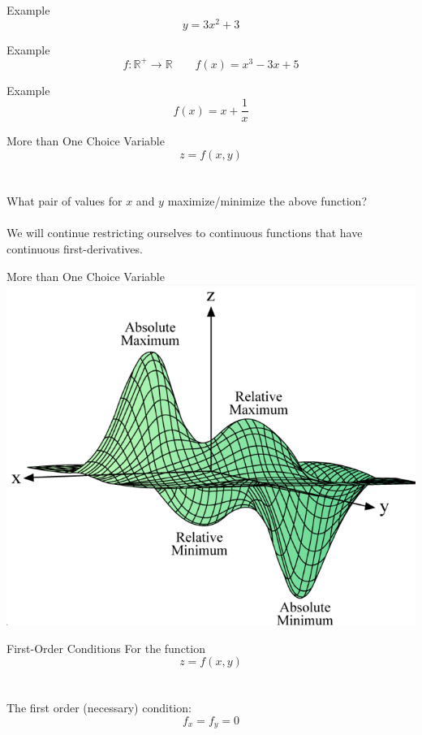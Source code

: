 \documentclass{./../../Latex/teaching_slides}
\begin{document}
\begin{frame}{Example}
$$ y = 3x^2+3 $$
\end{frame}

\begin{frame}{Example}
$$ f: \mathbb{R}^+ \rightarrow \mathbb{R} \quad \quad f(x) = x^3-3x+5 $$
\end{frame}

\begin{frame}{Example}
$$ f(x) = x + \frac{1}{x} $$

\end{frame}


\begin{frame}{More than One Choice Variable}
$$ z= f(x, y) $$ \\~\\

What pair of values for $x$ and $y$ maximize/minimize the above function? \\~\\

We will continue restricting ourselves to continuous functions that have continuous first-derivatives. 
\end{frame}

\begin{frame}{More than One Choice Variable}
\centering
\includegraphics[scale=0.35]{3dOptima3.png}
\end{frame}

\begin{frame}{First-Order Conditions}
For the function 
$$ z= f(x, y) $$ \\~\\
The first order (necessary) condition:
$$ f_x = f_y = 0  $$
\end{frame}
\end{document}
